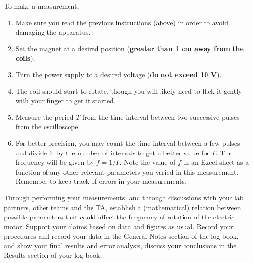 \documentclass[12pt]{report}
\begin{document}
To make a measurement,
\begin{enumerate}
\item Make sure you read the previous instructions (above) in order to avoid damaging the apparatus.
\item Set the magnet at a desired position (\textbf{greater than 1 cm away from the coils}).
\item Turn the power supply to a desired voltage (\textbf{do not exceed 10 V}).
\item The coil should start to rotate, though you will likely need to flick it gently with your finger to get it started.
\item Measure the period $T$ from the time interval between two successive pulses from the oscilloscope.
\item For better precision, you may count the time interval between a few pulses and divide it by the number of intervals to get a better value for $T$. The frequency will be given by $f = 1/T$. Note the value of $f$ in an Excel sheet as a function of any other relevant parameters you varied in  this measurement. Remember to keep track of errors in your measurements.
\end{enumerate}

{\color{blue} Through performing your measurements, and through discussions with your lab partners, other teams and the TA, establish a (mathematical) relation between possible parameters that could affect the frequency of rotation of the electric motor. 
Support your claims based on data and figures as usual. Record your procedures and record your data in the General Notes section of the log book, and show your final results and error analysis, discuss your conclusions in the Results section of your log book.}
\end{document}

